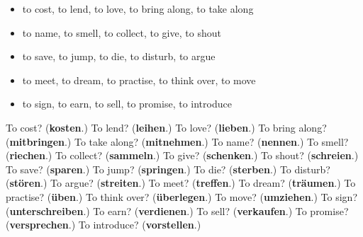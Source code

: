 \begin{itemize}
\raggedright
  \item to cost, to lend, to love, to bring along, to take along
  \item to name, to smell, to collect, to give, to shout
  \item to save, to jump, to die, to disturb, to argue
  \item to meet, to dream, to practise, to think over, to move
  \item to sign, to earn, to sell, to promise, to introduce
\end{itemize}

\begin{tcolorbox}[breakable,colback=teal!4,colframe=teal!35!black,title={Before you move on}]
To cost? (\textbf{kosten}.) To lend? (\textbf{leihen}.) To love? (\textbf{lieben}.) To bring along? (\textbf{mitbringen}.) To take along? (\textbf{mitnehmen}.) To name? (\textbf{nennen}.) To smell? (\textbf{riechen}.) To collect? (\textbf{sammeln}.) To give? (\textbf{schenken}.) To shout? (\textbf{schreien}.) To save? (\textbf{sparen}.) To jump? (\textbf{springen}.) To die? (\textbf{sterben}.) To disturb? (\textbf{stören}.) To argue? (\textbf{streiten}.) To meet? (\textbf{treffen}.) To dream? (\textbf{träumen}.) To practise? (\textbf{üben}.) To think over? (\textbf{überlegen}.) To move? (\textbf{umziehen}.) To sign? (\textbf{unterschreiben}.) To earn? (\textbf{verdienen}.) To sell? (\textbf{verkaufen}.) To promise? (\textbf{versprechen}.) To introduce? (\textbf{vorstellen}.)
\end{tcolorbox}
